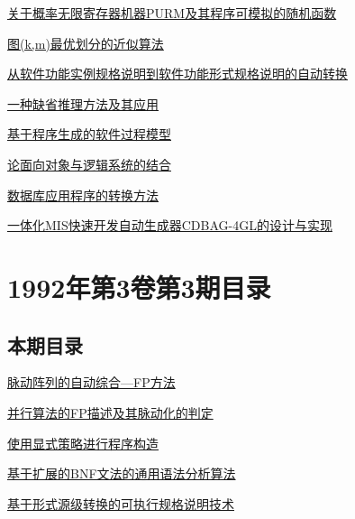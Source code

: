 \documentclass[a4paper]{article}
\begin{document}
\href{http://www.jos.org.cn/ch/reader/download_pdf.aspx?file_no=19920402&year_id=1992&quarter_id=4&falg=1}{关于概率无限寄存器机器PURM及其程序可模拟的随机函数}

\href{http://www.jos.org.cn/ch/reader/download_pdf.aspx?file_no=19920403&year_id=1992&quarter_id=4&falg=1}{图(k,m)最优划分的近似算法}

\href{http://www.jos.org.cn/ch/reader/download_pdf.aspx?file_no=19920404&year_id=1992&quarter_id=4&falg=1}{从软件功能实例规格说明到软件功能形式规格说明的自动转换}

\href{http://www.jos.org.cn/ch/reader/download_pdf.aspx?file_no=19920405&year_id=1992&quarter_id=4&falg=1}{一种缺省推理方法及其应用}

\href{http://www.jos.org.cn/ch/reader/download_pdf.aspx?file_no=19920406&year_id=1992&quarter_id=4&falg=1}{基于程序生成的软件过程模型}

\href{http://www.jos.org.cn/ch/reader/download_pdf.aspx?file_no=19920407&year_id=1992&quarter_id=4&falg=1}{论面向对象与逻辑系统的结合}

\href{http://www.jos.org.cn/ch/reader/download_pdf.aspx?file_no=19920408&year_id=1992&quarter_id=4&falg=1}{数据库应用程序的转换方法}

\href{http://www.jos.org.cn/ch/reader/download_pdf.aspx?file_no=19920409&year_id=1992&quarter_id=4&falg=1}{一体化MIS快速开发自动生成器CDBAG-4GL的设计与实现}


\section{\textbf{1992年第3卷第3期目录}}
\subsection{本期目录}
\href{http://www.jos.org.cn/ch/reader/download_pdf.aspx?file_no=19920301&year_id=1992&quarter_id=3&falg=1}{脉动阵列的自动综合—FP方法}

\href{http://www.jos.org.cn/ch/reader/download_pdf.aspx?file_no=19920302&year_id=1992&quarter_id=3&falg=1}{并行算法的FP描述及其脉动化的判定}

\href{http://www.jos.org.cn/ch/reader/download_pdf.aspx?file_no=19920303&year_id=1992&quarter_id=3&falg=1}{使用显式策略进行程序构造}

\href{http://www.jos.org.cn/ch/reader/download_pdf.aspx?file_no=19920304&year_id=1992&quarter_id=3&falg=1}{基于扩展的BNF文法的通用语法分析算法}

\href{http://www.jos.org.cn/ch/reader/download_pdf.aspx?file_no=19920305&year_id=1992&quarter_id=3&falg=1}{基于形式源级转换的可执行规格说明技术}
\end{document}
